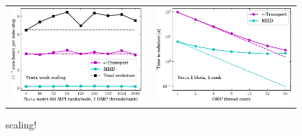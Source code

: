 \begin{figure}
  \begin{tabular}{ll}
    \includegraphics[width=3.2in]{figs/wkScaleSparkM1_theta} & \hspace{-16pt}
    \includegraphics[width=3.2in]{figs/thrdSpeedupSparkM1_theta}
  \end{tabular}
  \caption{\thet scaling!}
\end{figure}
